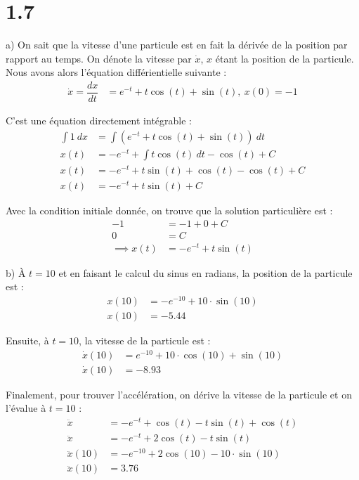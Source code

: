 \section*{1.7}

a) On sait que la vitesse d'une particule est en fait la dérivée de la position
par rapport au temps. On dénote la vitesse par $\dot{x}$, $x$ étant la position
de la particule. Nous avons alors l'équation différientielle suivante :
\begin{align*}
    \dot{x} = \dfrac{dx}{dt} &= e^{-t} + t\cos(t) + \sin(t),\ 
    x(0) = -1
\end{align*}

C'est une équation directement intégrable :
\begin{align*}
    \int{1\ dx} &= \int{(e^{-t} + t\cos(t) + \sin(t))\ dt} \\
    x(t) &= -e^{-t} + \int{t\cos(t)\ dt} -\cos(t) + C\\
    x(t) &= -e^{-t} + t\sin(t) + \cos(t) -\cos(t) + C\\
    x(t) &= -e^{-t} + t\sin(t) + C
\end{align*}

Avec la condition initiale donnée, on trouve que la solution particulière est :
\begin{align*}
    -1 &= -1 + 0 + C\\
    0 &= C \\
    \implies x(t) &= -e^{-t} + t\sin(t)
\end{align*}

b) À $t = 10$ et en faisant le calcul du sinus en radians,
la position de la particule est :
\begin{align*}
    x(10) &= -e^{-10} + 10\cdot\sin(10) \\
    x(10) &= -5.44
\end{align*}

Ensuite, à $t = 10$, la vitesse de la particule est :
\begin{align*}
    \dot{x}(10) &= e^{-10} + 10\cdot\cos(10) + \sin(10) \\
    \dot{x}(10) &= -8.93
\end{align*}

Finalement, pour trouver l'accélération, on dérive la vitesse de la particule
et on l'évalue à $t = 10$ :
\begin{align*}
    \ddot{x} &= -e^{-t} + \cos(t) - t\sin(t) + \cos(t)\\
    \ddot{x} &= -e^{-t} + 2\cos(t) - t\sin(t) \\
    \ddot{x}(10) &= -e^{-10} + 2\cos(10) - 10\cdot\sin(10) \\
    \ddot{x}(10) &= 3.76
\end{align*}

